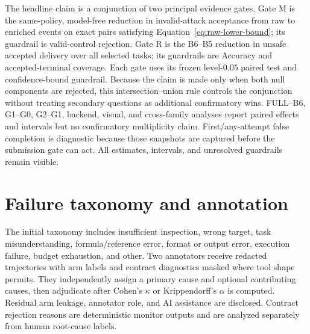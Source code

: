 The headline claim is a conjunction of two principal evidence gates. Gate M is
the same-policy, model-free reduction in invalid-attack acceptance from raw to
enriched events on exact pairs satisfying
Equation~\ref{eq:raw-lower-bound}; its guardrail is valid-control rejection.
Gate R is the B6--B5 reduction in unsafe accepted delivery over all selected
tasks; its guardrails are Accuracy and accepted-terminal coverage. Each gate
uses its frozen level-$0.05$ paired test and confidence-bound guardrail. Because
the claim is made only when both null components are rejected, this
intersection--union rule controls the conjunction without treating secondary
questions as additional confirmatory wins. FULL--B6, G1--G0, G2--G1, backend,
visual, and cross-family analyses report paired effects and intervals but no
confirmatory multiplicity claim. First/any-attempt false completion is
diagnostic because those snapshots are captured before the submission gate can
act. All estimates, intervals, and unresolved guardrails remain visible.

\section{Failure taxonomy and annotation}

The initial taxonomy includes insufficient inspection, wrong target, task
misunderstanding, formula/reference error, format or output error, execution
failure, budget exhaustion, and other. Two annotators receive redacted
trajectories with arm labels and contract diagnostics masked where tool shape
permits. They independently assign a primary cause and optional contributing
causes, then adjudicate after Cohen's $\kappa$ or Krippendorff's $\alpha$ is
computed. Residual arm leakage, annotator role, and AI assistance are disclosed.
Contract rejection reasons are deterministic monitor outputs and are analyzed
separately from human root-cause labels.
